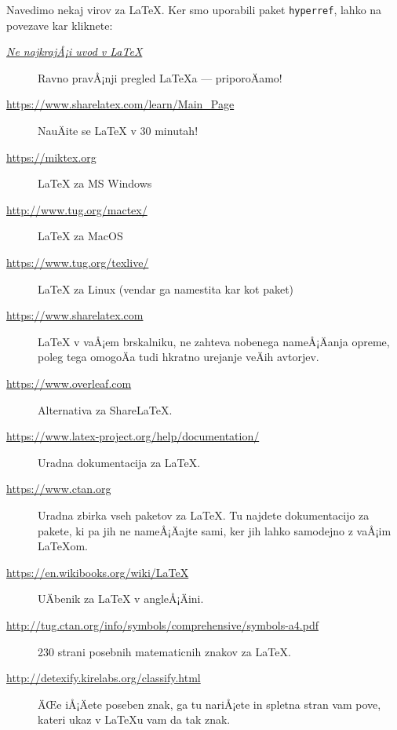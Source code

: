 \documentclass[a4paper]{article}
\begin{document}
Navedimo nekaj virov za {\LaTeX}. Ker smo uporabili paket \texttt{hyperref}, lahko na povezave kar kliknete:
%
\begin{description}
\item[\href{http://www-lp.fmf.uni-lj.si/plestenjak/vaje/latex/lshort.pdf}{\emph{Ne najkrajÅ¡i uvod v {\LaTeX}}}]
  Ravno pravÅ¡nji pregled {\LaTeX}a --- priporoÄamo!

\item[\url{https://www.sharelatex.com/learn/Main_Page}]
  NauÄite se LaTeX v 30 minutah!

\item[\url{https://miktex.org}] LaTeX za MS Windows

\item[\url{http://www.tug.org/mactex/}] LaTeX za MacOS

\item[\url{https://www.tug.org/texlive/}] LaTeX za Linux (vendar ga namestita kar kot paket)

\item[\url{https://www.sharelatex.com}] LaTeX v vaÅ¡em brskalniku, ne zahteva nobenega
  nameÅ¡Äanja opreme, poleg tega omogoÄa tudi hkratno urejanje veÄih avtorjev.

\item[\url{https://www.overleaf.com}]
  Alternativa za ShareLaTeX.

\item[\url{https://www.latex-project.org/help/documentation/}]
  Uradna dokumentacija za {\LaTeX}.

\item[\url{https://www.ctan.org}] Uradna zbirka vseh paketov za {\LaTeX}. Tu najdete
  dokumentacijo za pakete, ki pa jih ne nameÅ¡Äajte sami, ker jih lahko samodejno z vaÅ¡im
  LaTeXom.

\item[\url{https://en.wikibooks.org/wiki/LaTeX}]
  UÄbenik za LaTeX v angleÅ¡Äini.

\item[\url{http://tug.ctan.org/info/symbols/comprehensive/symbols-a4.pdf}]
  230 strani posebnih matematicnih znakov za {\LaTeX}.

\item[\url{http://detexify.kirelabs.org/classify.html}] ÄŒe iÅ¡Äete poseben znak, ga tu
  nariÅ¡ete in spletna stran vam pove, kateri ukaz v {\LaTeX}u vam da tak znak.
\end{description}
\end{document}
